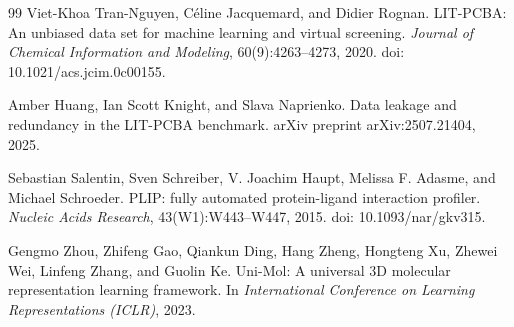 \documentclass[10pt,letterpaper,twocolumn]{article}
\begin{document}
\begin{thebibliography}{99}
Viet-Khoa Tran-Nguyen, C\'eline Jacquemard, and Didier Rognan.
LIT-PCBA: An unbiased data set for machine learning and virtual screening.
\emph{Journal of Chemical Information and Modeling}, 60(9):4263--4273, 2020.
doi: 10.1021/acs.jcim.0c00155.

Amber Huang, Ian Scott Knight, and Slava Naprienko.
Data leakage and redundancy in the LIT-PCBA benchmark.
arXiv preprint arXiv:2507.21404, 2025.

Sebastian Salentin, Sven Schreiber, V. Joachim Haupt, Melissa F. Adasme, and Michael Schroeder.
PLIP: fully automated protein-ligand interaction profiler.
\emph{Nucleic Acids Research}, 43(W1):W443--W447, 2015.
doi: 10.1093/nar/gkv315.

Gengmo Zhou, Zhifeng Gao, Qiankun Ding, Hang Zheng, Hongteng Xu, Zhewei Wei, Linfeng Zhang, and Guolin Ke.
Uni-Mol: A universal 3D molecular representation learning framework.
In \emph{International Conference on Learning Representations (ICLR)}, 2023.

\end{thebibliography}
\end{document}
